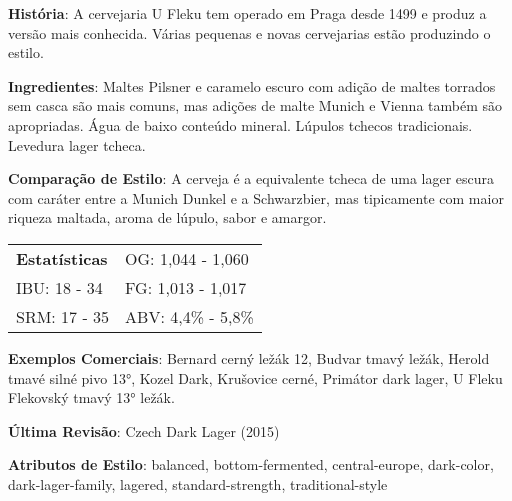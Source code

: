 \textbf{História}: A cervejaria U Fleku tem operado em Praga desde 1499 e produz a versão mais conhecida. Várias pequenas e novas cervejarias estão produzindo o estilo.

\textbf{Ingredientes}: Maltes Pilsner e caramelo escuro com adição de maltes torrados sem casca são mais comuns, mas adições de malte Munich e Vienna também são apropriadas. Água de baixo conteúdo mineral. Lúpulos tchecos tradicionais. Levedura lager tcheca.

\textbf{Comparação de Estilo}: A cerveja é a equivalente tcheca de uma lager escura com caráter entre a Munich Dunkel e a Schwarzbier, mas tipicamente com maior riqueza maltada, aroma de lúpulo, sabor e amargor.

\begin{tabular}{@{}p{35mm}p{35mm}@{}}
  \textbf{Estatísticas} & OG: 1,044 - 1,060 \\
  IBU: 18 - 34  & FG: 1,013 - 1,017  \\
  SRM: 17 - 35   & ABV: 4,4\% - 5,8\%
\end{tabular}

\textbf{Exemplos Comerciais}: Bernard cerný ležák 12, Budvar tmavý ležák, Herold tmavé silné pivo 13°, Kozel Dark, Krušovice cerné, Primátor dark lager, U Fleku Flekovský tmavý 13° ležák.

\textbf{Última Revisão}: Czech Dark Lager (2015)

\textbf{Atributos de Estilo}: balanced, bottom-fermented, central-europe, dark-color, dark-lager-family, lagered, standard-strength, traditional-style
